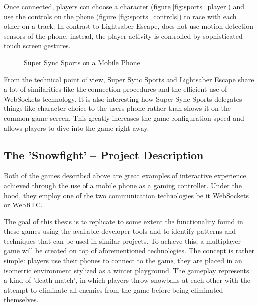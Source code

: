 \newpage

Once connected, players can choose a character (figure \ref{fig:sports_player})
and use the controls on the phone (figure \ref{fig:sports_controls}) to race
with each other on a track. In contrast to Lightsaber Escape, does not use
motion-detection sensors of the phone, instead, the player activity is
controlled by sophisticated touch screen gestures.

\begin{figure}[!ht]
    \centering
    \hspace{0.1\textwidth}
    \caption{Super Sync Sports on a Mobile Phone}
\end{figure}

From the technical point of view, Super Sync Sports and Lightsaber Escape share
a lot of similarities like the connection procedures and the efficient use of
WebSockets technology. It is also interesting how Super Sync Sports delegates
things like character choice to the users phone rather than shows it on the
common game screen. This greatly increases the game configuration speed and
allows players to dive into the game right away.

\subsection{The 'Snowfight' -- Project Description}

Both of the games described above are great examples of interactive experience
achieved through the use of a mobile phone as a gaming controller. Under the
hood, they employ one of the two communication technologies be it WebSockets or
WebRTC.

The goal of this thesis is to replicate to some extent the functionality found
in these games using the available developer tools and to identify patterns and
techniques that can be used in similar projects. To achieve this, a multiplayer
game will be created on top of aforementioned technologies. The concept is
rather simple: players use their phones to connect to the game, they are placed
in an isometric environment stylized as a winter playground. The gameplay
represents a kind of 'death-match', in which players throw snowballs at each
other with the attempt to eliminate all enemies from the game before being
eliminated themselves.

